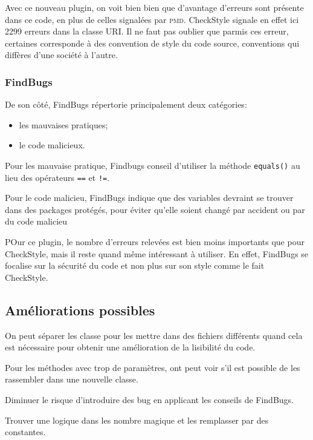 			Avec ce nouveau plugin, on voit bien bien que d'avantage d'erreurs sont présente dans ce code, en plus de celles signalées par \textsc{pmd}. CheckStyle signale en effet ici 2299 erreurs dans la classe URI. Il ne faut pas oublier que parmis ces erreur, certaines corresponde à des convention de style du code source, conventions qui diffères d'une société à l'autre.

		\subsubsection{FindBugs}
			De son côté, FindBugs répertorie principalement deux catégories:
			\begin{itemize}
				\item les mauvaises pratiques;
				\item le code malicieux.
			\end{itemize}

			Pour les mauvaise pratique, Findbugs conseil d'utiliser la méthode \verb+equals()+ au lieu des opérateurs \verb+==+ et \verb+!=+.

			Pour le code malicieu, FindBugs indique que des variables devraint se trouver dans des packages protégés, pour éviter qu'elle soient changé par accident ou par du code malicieu

			POur ce plugin, le nombre d'erreurs relevées est bien moins importants que pour CheckStyle, mais il reste quand même intéressant à utiliser. En effet, FindBugs se focalise sur la sécurité du code et  non plus sur son style comme le fait CheckStyle.

	\subsection{Améliorations possibles}
		On peut séparer les classe pour les mettre dans des fichiers différents quand cela est nécessaire pour obtenir une amélioration de la lisibilité du code.

		Pour les méthodes avec trop de paramètres, ont peut voir s'il est possible de les rassembler dans une nouvelle classe.

		Diminuer le risque d'introduire des bug en applicant les conseils de FindBugs.

		Trouver une logique dans les nombre magique et les remplasser par des constantes.